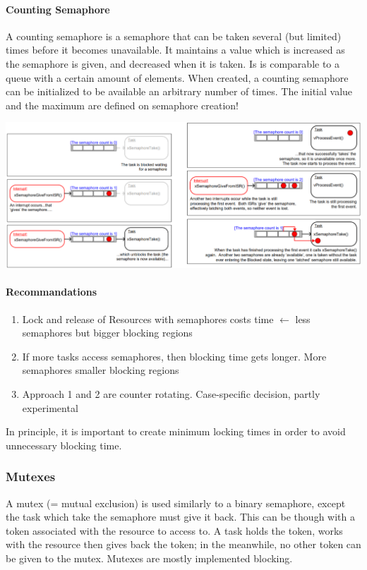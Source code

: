 \paragraph{Counting Semaphore}
A counting semaphore is a semaphore that can be taken several (but limited) times before it becomes unavailable.
It maintains a value which is increased as the semaphore is given, and decreased when it is taken.
Is is comparable to a queue with a certain amount of elements.
When created, a counting semaphore can be initialized to be available an arbitrary number of times.
The initial value and the maximum are defined on semaphore creation!

\includegraphics[width=\textwidth]{images/Concurrency/counting_semaphore.png}

\paragraph{Recommandations}
\begin{enumerate}
  \item Lock and release of Resources with semaphores costs time $\leftarrow$ less semaphores but bigger blocking regions
  \item If more tasks access semaphores, then blocking time gets longer.
        More semaphores smaller blocking regions
  \item Approach 1 and 2 are counter rotating.
        Case-specific decision, partly experimental
\end{enumerate}
In principle, it is important to create minimum locking times in order to avoid unnecessary blocking time.

\subsubsection{Mutexes}
A mutex (= mutual exclusion) is used similarly to a binary semaphore, except the task which take the semaphore must give it back.
This can be though with a token associated with the resource to access to.
A task holds the token, works with the resource then gives back the token; in the meanwhile, no other token can be given to the mutex.
Mutexes are mostly implemented blocking.

